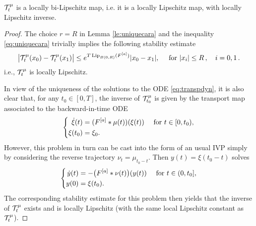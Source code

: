 \begin{proposition}\label{p-transportlip}
$\mathcal{T}^\mu_t$ is a locally bi-Lipschitz map, i.e. it is a locally Lipschitz map, with locally Lipschitz inverse.
\end{proposition}
\begin{proof}
	
 The choice $r = R$ in Lemma \ref{le:uniquecara} and the inequality \eqref{eq:uniquecara} trivially implies the following stability estimate
	\begin{align}\label{eq:liptrans}
		\bigl|\mathcal{T}^\mu_t(x_0)-\mathcal{T}^\mu_t(x_1)\bigr|
			\leq e^{T\,\textup{Lip}_{B(0,R)}(F^{[a]})}|x_0-x_1|,\quad \text{ for } |x_i|\leq R\,,\quad i=0,1\,.
	\end{align}
	i.e., $\mathcal{T}^\mu_t$ is locally Lipschitz.
	
	In view of the uniqueness of the solutions to the ODE \eqref{eq:transpdyn}, it is also clear that, for any $t_0\in [0,T]$, the inverse of $\mathcal{T}^\mu_{t_0}$ is
	given by the transport map associated to the backward-in-time ODE
\begin{align*}
\left\{\begin{aligned}
\dot{\xi}(t) &= (F^{[a]}*\mu(t))(\xi(t)) \quad \text{ for } t \in [0,t_0),\\
\xi(t_0) &= \xi_0.
\end{aligned}\right.
\end{align*}
	However, this problem in turn can be cast into the form of an usual IVP simply by considering the reverse trajectory $\nu_t=\mu_{t_0-t}$. Then
	$y(t)=\xi(t_0-t)$ solves
	\begin{align*}
	\left\{\begin{aligned}
		\dot y(t)&=-\bigl(F^{[a]}\ast\nu(t)\bigr)(y(t))  \quad \text{ for } t \in (0,t_0], \\
		y(0) &= \xi(t_0).
	\end{aligned}\right.
	\end{align*}
	The corresponding stability estimate for this problem then yields that the inverse of $\mathcal{T}^\mu_t$ exists and is locally Lipschitz (with the same local Lipschitz constant as $\mathcal{T}^\mu_t$).
\end{proof}


